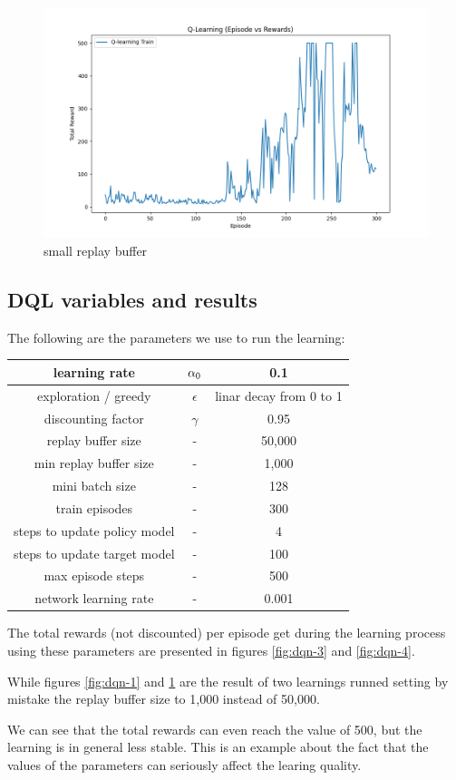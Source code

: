 \documentclass{article}
\begin{document}
\begin{figure}
  \includegraphics[width=\linewidth]{DQN-0002.png}
  \caption{small replay buffer}
  \label{fig:dqn-2}
\end{figure}

\subsection{DQL variables and results}

The following are the parameters we use to run the learning:

\begin{center}
\begin{tabular}{ |c|c|c| }
  \hline
  learning rate & $\alpha\textsubscript{0}$ & 0.1 \\
  \hline
  exploration / greedy & $\epsilon$ & linar decay from 0 to 1 \\
  \hline
  discounting factor & $\gamma$ & 0.95 \\  
  \hline
  replay buffer size & - & 50,000 \\
  \hline
  min replay buffer size & - & 1,000 \\
  \hline
  mini batch size & - & 128 \\
  \hline
  train episodes & - & 300 \\
  \hline
  steps to update policy model & - & 4 \\
  \hline
  steps to update target model & - & 100  \\
  \hline
  max episode steps & - & 500 \\
  \hline
  network learning rate & - & 0.001 \\
  \hline
\end{tabular}
\end{center}

The total rewards (not discounted) per episode get during the learning process using these parameters are presented in
figures \ref{fig:dqn-3} and \ref{fig:dqn-4}.

While figures \ref{fig:dqn-1} and \ref{fig:dqn-2} are the result of two learnings runned 
setting by mistake the replay buffer size to 1,000 instead of 50,000.

We can see that the total rewards can even reach the value of 500, but the learning is in general less stable.
This is an example about the fact that the values of the parameters can seriously affect the learing quality.
\end{document}
